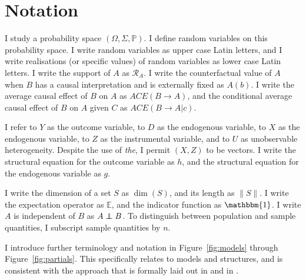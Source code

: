 \documentclass[12pt,a4paper,twoside]{article}
\newcommand\independent{\protect\mathpalette{\protect\independenT}{\perp}}
\def\independenT#1#2{\mathrel{\rlap{$#1#2$}\mkern2mu{#1#2}}}
\numberwithin{equation}{section}
\begin{document}
\section*{Notation}
I study a probability space $(\Omega,\Sigma,\mathbb{P})$. I define random variables on this probability space. I write random variables as upper case Latin letters, and I write realisations (or specific values) of random variables as lower case Latin letters. I write the support of $A$ as $\mathcal{R}_A$. I write the counterfactual value of $A$ when $B$ has a causal interpretation and is externally fixed as $A(b)$. I write the average causal effect of $B$ on $A$ as $ACE(B\rightarrow A)$, and the conditional average causal effect of $B$ on $A$ given $C$ as $ACE(B\rightarrow A|c)$.

I refer to $Y$ as the outcome variable, to $D$ as the endogenous variable, to $X$ as the endogenous variable, to $Z$ as the instrumental variable, and to $U$ as unobservable heterogeneity. Despite the use of \emph{the}, I permit $(X,Z)$ to be vectors. I write the structural equation for the outcome variable as $h$, and the structural equation for the endogenous variable as $g$.  

I write the dimension of a set $S$ as $\dim(S)$, and its length as $\| S\|$. I write the expectation operator as $\mathbb{E}$, and the indicator function as $\mathbbm{1}$. I write $A$ is independent of $B$ as $A\independent B$. To distinguish between population and sample quantities, I subscript sample quantities by $n$. 

I introduce further terminology and notation in Figure~\ref{fig:models} through Figure~\ref{fig:partials}. This specifically relates to models and structures, and is consistent with the approach that is formally laid out in \cite{h50} and in \cite{krE50}. 
\end{document}
